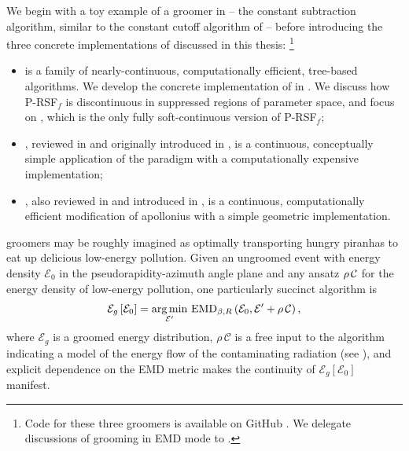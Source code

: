We begin with a toy example of a \PIRANHA{} groomer in  -- the constant subtraction algorithm, similar to the constant cutoff algorithm of  -- before introducing the three concrete implementations of \PIRANHA{} discussed in this thesis:%
\footnote{
    Code for these three \PIRANHA{} groomers is available on GitHub \cite{piranhagithub}.
    We delegate discussions of \PIRANHA{} grooming in EMD mode to .
}
\begin{itemize}
    \item
     is a family of nearly-continuous, computationally efficient, tree-based algorithms.
    We develop the concrete implementation of  in .
    We discuss how P-RSF\(_f\) is discontinuous in suppressed regions of parameter space, and focus on , which is the only fully soft-continuous version of P-RSF\(_f\);

    \item
    , reviewed in  and originally introduced in , is a continuous, conceptually simple application of the \PIRANHA{} paradigm with a computationally expensive implementation;

    \item
        , also reviewed in  and introduced in , is a continuous, computationally efficient modification of \gls{apollonius} with a simple geometric implementation.
\end{itemize}


\PIRANHA{} groomers may be roughly imagined as optimally transporting hungry piranhas to eat up delicious low-energy pollution.
%
Given an ungroomed event with energy density \(\mathcal{E}_{0}\) in the pseudorapidity-azimuth angle plane and any ansatz \(\rho\,\mathcal{C}\) for the energy density of low-energy pollution, one particularly succinct \PIRANHA{} algorithm is
%
%
\begin{align}
    \mathcal{E}_g\left[\mathcal{E}_0\right]
    =
    \underset{\mathcal{E}'}{\arg \min}\ {\rm EMD}_{\beta, R}
    \left(\mathcal{E}_0, \mathcal{E}' + \rhoC\right)
    \label{eq:simple_piranha_intro}
    ,
\end{align}
where \(\mathcal{E}_g\) is a groomed energy distribution, \(\rho\,\mathcal{C}\) is a free input to the algorithm indicating a model of the energy flow of the contaminating radiation (see ), and explicit dependence on the EMD metric makes the continuity of \(\mathcal{E}_g\left[\mathcal{E}_0\right]\) manifest.

